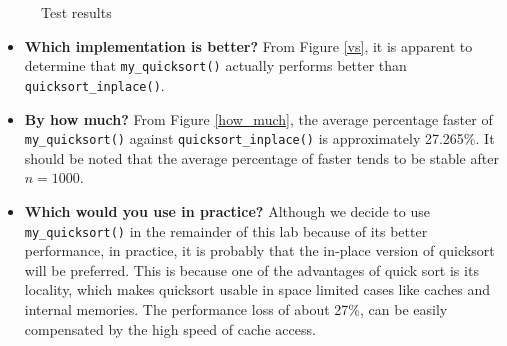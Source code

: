 \documentclass[12pt]{article}
\begin{document}
\begin{figure}[hbt!]
    \centering
    \hfill
    \caption{Test results}
\end{figure}

\newpage
\begin{itemize}
\item \textbf{Which implementation is better?}
From Figure \ref{vs}, it is apparent to determine that  \verb|my_quicksort()| actually performs better than \verb|quicksort_inplace()|.
\item \textbf{By how much?}
From Figure \ref{how_much}, the average percentage faster of \verb|my_quicksort()| against \verb|quicksort_inplace()| is approximately 27.265\%. It should be noted that the average percentage of faster tends to be stable after $n = 1000$.
\item \textbf{Which would you use in practice?}
Although we decide to use \verb|my_quicksort()| in the remainder of this lab because of its better performance, in practice, it is probably that the in-place version of quicksort will be preferred. This is because one of the advantages of quick sort is its locality, which makes quicksort usable in space limited cases like caches and internal memories. The performance loss of about 27\%, can be easily compensated by the high speed of cache access.

\end{itemize}
\end{document}
